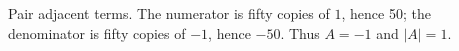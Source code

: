 Pair adjacent terms. The numerator is fifty copies of $1$, hence 50; the denominator is fifty copies of $-1$, hence $-50$. Thus $A=-1$ and $\boxed{|A|=1}$.
